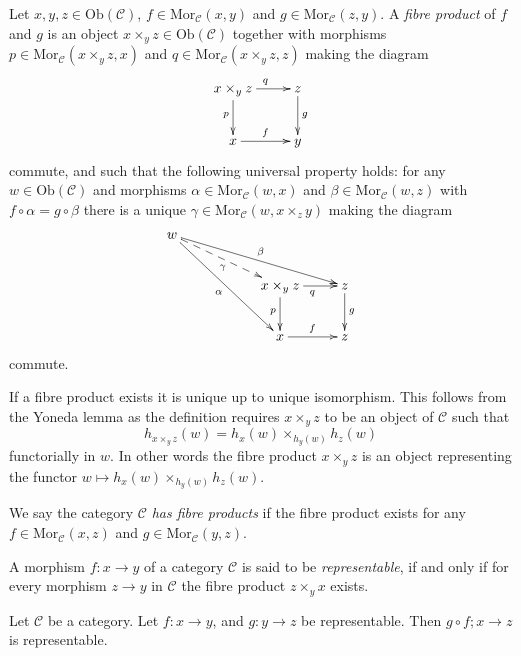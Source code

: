 \begin{definition}
\label{definition-fibre-products}
Let $x,y,z\in \text{Ob}(\mathcal{C})$,
$f\in \text{Mor}_{\mathcal{C}}(x,y)$
and $g\in \text{Mor}_{\mathcal C}(z,y)$.
A {\it fibre product} of $f$ and $g$ is
an object $x\times_y z\in \text{Ob}(\mathcal{C})$
together with morphisms 
$p\in \text{Mor}_{\mathcal C}(x\times_y z,x)$ and 
$q\in\text{Mor}_{\mathcal C}(x\times_y z,z)$ making the diagram
$$
\xymatrix{
x\times_y z \ar[r]^{q} \ar[d]_{p}
&
z \ar[d]^{g}
\\
x \ar[r]^{f}
&
y
}
$$
commute, and such that the following universal property holds: for
any $w\in \text{Ob}(\mathcal{C})$ and morphisms 
$\alpha \in \text{Mor}_{\mathcal C}(w,x)$ and 
$\beta \in \text{Mor}_{\mathcal{C}}(w,z)$ with
$f \circ \alpha= g\circ \beta$
there is a unique
$\gamma\in \text{Mor}_{\mathcal C}(w,x\times_z y)$ making
the diagram
$$
\xymatrix{
w \ar[rrrd]^\beta \ar@{-->}[rrd]_\gamma \ar[rrdd]_\alpha
&
&
\\
&
&
x\times_y z \ar[d]_{p} \ar[r]_{q}
&
z \ar[d]^{g}
\\
&
&
x \ar[r]^{f}
&
z
}
$$
commute.
\end{definition}

\noindent
If a fibre product exists it is unique up to unique
isomorphism. This follows from the Yoneda lemma as
the definition requires $x\times_yz$ to be an object
of $\mathcal{C}$ such that
$$
h_{x\times_y z}(w) = h_x(w) \times_{h_y(w)} h_z(w)
$$
functorially in $w$. In other words the fibre product $x\times_yz$
is an object representing the functor
$w \mapsto h_x(w) \times_{h_y(w)} h_z(w)$.

\begin{definition}
\label{definition-has-fibre-products}
We say the category $\mathcal{C}$ {\it has fibre products} if
the fibre product exists for any $f\in \text{Mor}_{\mathcal C}(x,z)$
and $g\in \text{Mor}_{\mathcal C}(y,z)$.
\end{definition}

\begin{definition}
\label{definition-representable-morphism}
A morphism $f : x \to y$ of a category $\mathcal{C}$ is said to be
{\it representable}, if and only if for every morphism $z \to y$
in $\mathcal{C}$ the fibre product $z\times_y x$ exists.
\end{definition}

\begin{lemma}
\label{lemma-composition-representable}
Let $\mathcal{C}$ be a category.
Let $f : x \to y$, and $g : y \to z$ be representable.
Then $g \circ f ; x \to z$ is representable.
\end{lemma}

